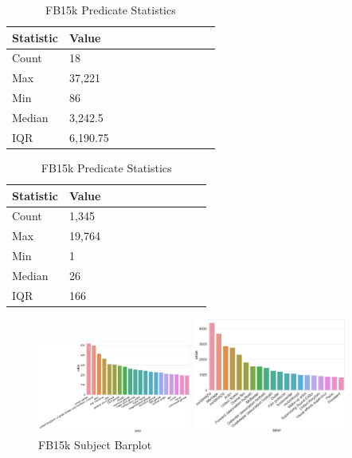 \begin{table}[H]
	\parbox{.5\linewidth}{
		\caption{WN18 Predicate Statistics}
		\centering
		\begin{tabular}{lllllllllll}
  			\textbf{Statistic} & \textbf{Value}  \\
  			\hline
			Count & 18 \\
			Max & 37,221  \\
			Min & 86 \\
  			Median & 3,242.5  \\
  			IQR & 6,190.75  \\
		\end{tabular}
		}
	\hfill
	\parbox{.5\linewidth}{
		\caption{FB15k Predicate Statistics}
		\centering
		\begin{tabular}{lllllllllll}
  			\textbf{Statistic} & \textbf{Value}  \\
  			\hline
			Count & 1,345 \\
			Max & 19,764  \\
			Min & 1  \\
  			Median & 26  \\
  			IQR & 166  \\
		\end{tabular}
		}
\end{table}


\begin{figure}[H]
	\parbox{.5\linewidth}{
   		\caption{WN18 Subject Barplot}
   		\centering
    		\includegraphics[width=0.45\textwidth, height=0.2\textheight]{WN18_Subject_Counts}
		}
	\hfill
	\parbox{.5\linewidth}{
		\caption{FB15k Subject Barplot}
   		\centering
		\includegraphics[width=0.45\textwidth, height=0.2\textheight]{FB15k_Subject_Counts}
		}
\end{figure}


